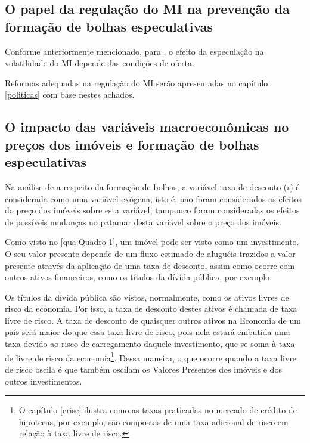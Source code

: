 \documentclass[
	12pt,				%
	oneside,			%
	a4paper,			%
	chapter=TITLE,		%
	section=TITLE,		%
	english,			%
	brazil				%
	]{abntex2}
\begin{document}
\hypertarget{o-papel-da-regulauxe7uxe3o-do-na-prevenuxe7uxe3o-da-formauxe7uxe3o-de-bolhas-especulativas}{%
\subsection{\texorpdfstring{O papel da regulação do \gls{MI} na prevenção da formação de bolhas especulativas}{O papel da regulação do  na prevenção da formação de bolhas especulativas}}\label{o-papel-da-regulauxe7uxe3o-do-na-prevenuxe7uxe3o-da-formauxe7uxe3o-de-bolhas-especulativas}}

Conforme anteriormente mencionado, para \textcite[p.~26]{Malpezzi2002TheRO}, o efeito da
especulação na volatilidade do \gls{MI} depende das condições de oferta.

Reformas adequadas na regulação do \gls{MI} serão apresentadas no capítulo
\ref{politicas} com base nestes achados.

\hypertarget{o-impacto-das-variuxe1veis-macroeconuxf4micas-no-preuxe7os-dos-imuxf3veis-e-formauxe7uxe3o-de-bolhas-especulativas}{%
\subsection{O impacto das variáveis macroeconômicas no preços dos imóveis e formação de bolhas especulativas}\label{o-impacto-das-variuxe1veis-macroeconuxf4micas-no-preuxe7os-dos-imuxf3veis-e-formauxe7uxe3o-de-bolhas-especulativas}}

Na análise de \textcite{Malpezzi2002TheRO} a respeito da formação de bolhas, a variável
taxa de desconto (\(i\)) é considerada como uma variável exógena, isto é, não
foram considerados os efeitos do preço dos imóveis sobre esta variável, tampouco
foram consideradas os efeitos de possíveis mudanças no patamar desta variável
sobre o preço dos imóveis.

Como visto no \ref{qua:Quadro-1}, um imóvel pode ser visto como um investimento.
O seu valor presente depende de um fluxo estimado de aluguéis trazidos a
valor presente através da aplicação de uma taxa de desconto, assim como ocorre
com outros ativos financeiros, como os títulos da dívida pública, por exemplo.

Os títulos da dívida pública são vistos, normalmente, como os ativos livres de
risco da economia. Por isso, a taxa de desconto destes ativos é chamada de taxa
livre de risco. A taxa de desconto de quaisquer outros ativos na Economia de um
país será maior do que essa taxa livre de risco, pois nela estará embutida uma
taxa devido ao risco de carregamento daquele investimento, que se soma à taxa de
livre de risco da economia\footnote{O capítulo \ref{crise} ilustra como as taxas praticadas no mercado de
  crédito de hipotecas, por exemplo, são compostas de uma taxa adicional de risco
  em relação à taxa livre de risco.}. Dessa maneira, o que ocorre quando a taxa livre
de risco oscila é que também oscilam os Valores Presentes dos imóveis e dos
outros investimentos.
\end{document}
